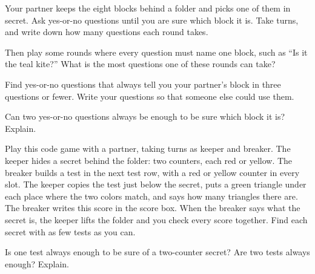 
\renewcommand{\blkscale}{0.66}
\renewcommand{\rc}{0.4}


\fontsize{13}{17.5}\selectfont

\problem Your partner keeps the eight blocks behind a folder and picks one of them in secret.
Ask yes-or-no questions until you are sure which block it is.
Take turns, and write down how many questions each round takes.

\eightblocks

\vspace{0.25in}
\noindent{}

\vspace{0.3in}
Then play some rounds where every question must name one block, such as ``Is it the teal kite?''
What is the most questions one of these rounds can take?

\vspace{0.1in}
\noindent\onebox

\newpage

\problem Find yes-or-no questions that always tell you your partner's block in three questions or fewer.
Write your questions so that someone else could use them.

\smallblocks


\vspace{0.3in}

\problem Can two yes-or-no questions always be enough to be sure which block it is? Explain.


\newpage

\problem Play this code game with a partner, taking turns as keeper and breaker.
The keeper hides a secret behind the folder: two counters, each red or yellow.
The breaker builds a test in the next test row, with a red or yellow counter in every slot.
The keeper copies the test just below the secret, puts a green triangle under each place where the two colors match, and says how many triangles there are.
The breaker writes this score in the score box.
When the breaker says what the secret is, the keeper lifts the folder and you check every score together.
Find each secret with as few tests as you can.

\vspace{0.1in}

\newpage

\problem Is one test always enough to be sure of a two-counter secret?
Are two tests always enough?
Explain.

